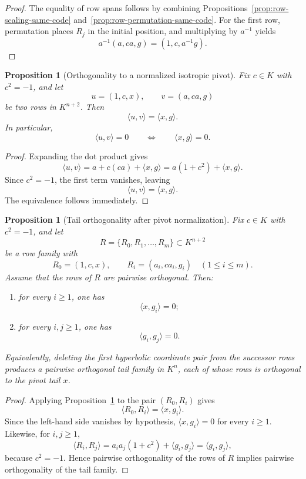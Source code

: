 \documentclass[12pt]{article}
\newtheorem{prop}[theorem]{Proposition}
\begin{document}
\begin{proof}
The equality of row spans follows by combining Propositions~\ref{prop:row-scaling-same-code} and~\ref{prop:row-permutation-same-code}. For the first row, permutation places $R_j$ in the initial position, and multiplying by $a^{-1}$ yields
\[
a^{-1}(a,c a,g)=(1,c,a^{-1}g).
\]
\end{proof}

\begin{prop}[Orthogonality to a normalized isotropic pivot]
\label{prop:orthogonal-normalized-isotropic-pivot}
Fix $c\in K$ with $c^2=-1$, and let
\[
u=(1,c,x),\qquad v=(a,c a,g)
\]
be two rows in $K^{n+2}$. Then
\[
\langle u,v\rangle = \langle x,g\rangle.
\]
In particular,
\[
\langle u,v\rangle = 0
\qquad\Longleftrightarrow\qquad
\langle x,g\rangle = 0.
\]
\end{prop}

\begin{proof}
Expanding the dot product gives
\[
\langle u,v\rangle
=
a+c(ca)+\langle x,g\rangle
=
a(1+c^2)+\langle x,g\rangle.
\]
Since $c^2=-1$, the first term vanishes, leaving
\[
\langle u,v\rangle=\langle x,g\rangle.
\]
The equivalence follows immediately.
\end{proof}

\begin{prop}[Tail orthogonality after pivot normalization]
\label{prop:tail-orthogonality-pivot-normalized}
Fix $c\in K$ with $c^2=-1$, and let
\[
R=\{R_0,R_1,\dots,R_m\}\subset K^{n+2}
\]
be a row family with
\[
R_0=(1,c,x),
\qquad
R_i=(a_i,c a_i,g_i)\quad (1\le i\le m).
\]
Assume that the rows of $R$ are pairwise orthogonal. Then:
\begin{enumerate}
\item for every $i\ge 1$, one has
\[
\langle x,g_i\rangle=0;
\]
\item for every $i,j\ge 1$, one has
\[
\langle g_i,g_j\rangle=0.
\]
\end{enumerate}
Equivalently, deleting the first hyperbolic coordinate pair from the successor rows produces a pairwise orthogonal tail family in $K^n$, each of whose rows is orthogonal to the pivot tail $x$.
\end{prop}

\begin{proof}
Applying Proposition~\ref{prop:orthogonal-normalized-isotropic-pivot} to the pair $(R_0,R_i)$ gives
\[
\langle R_0,R_i\rangle=\langle x,g_i\rangle.
\]
Since the left-hand side vanishes by hypothesis, $\langle x,g_i\rangle=0$ for every $i\ge 1$. Likewise, for $i,j\ge 1$,
\[
\langle R_i,R_j\rangle
=
a_i a_j(1+c^2)+\langle g_i,g_j\rangle
=
\langle g_i,g_j\rangle,
\]
because $c^2=-1$. Hence pairwise orthogonality of the rows of $R$ implies pairwise orthogonality of the tail family.
\end{proof}
\end{document}
